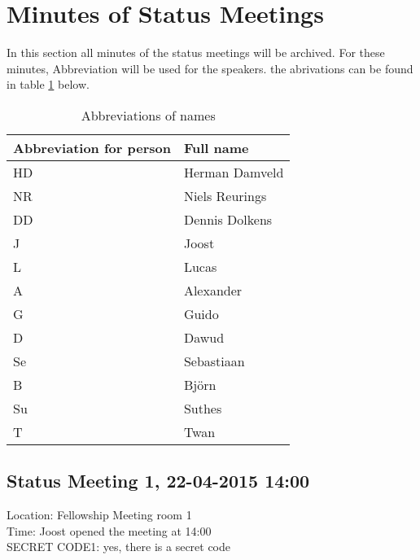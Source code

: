 \section{Minutes of Status Meetings}
In this section all minutes of the status meetings will be archived. For these minutes, Abbreviation will be used for the speakers. the abrivations can be found in table \ref{tab:Abb} below.

\begin{table}[H]
	\caption {Abbreviations of names}
	\centering
    \begin{tabular}{|l|l|}
    \hline
    Abbreviation for person & Full name      \\ \hline
    HD                      & Herman Damveld \\ \hline
    NR                      & Niels Reurings \\ \hline
    DD                      & Dennis Dolkens \\ \hline
    J                       & Joost          \\ \hline
    L                       & Lucas          \\ \hline
    A                       & Alexander      \\ \hline
    G                       & Guido          \\ \hline
    D                       & Dawud          \\ \hline
    Se                      & Sebastiaan     \\ \hline
    B                       & Bj\"{o}rn      \\ \hline
    Su                      & Suthes         \\ \hline
    T                       & Twan           \\ \hline
    \end{tabular}
    \label{tab:Abb}
\end{table}



\subsection{Status Meeting 1, 22-04-2015 14:00}
Location: Fellowship Meeting room 1\\
Time: Joost opened the meeting at 14:00\\
SECRET CODE1: yes, there is a secret code

